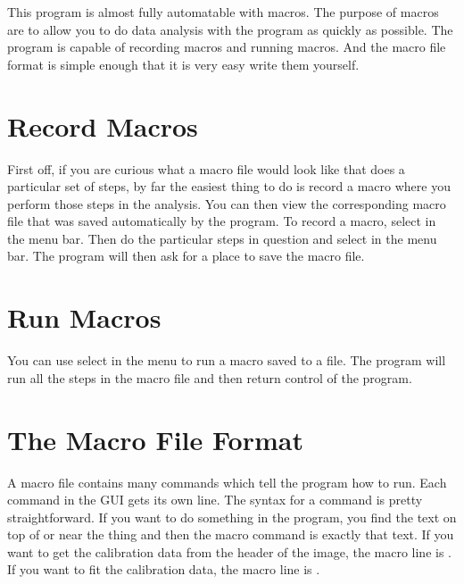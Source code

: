 This program is almost fully automatable with macros. The 
purpose of macros are to allow you to do data analysis with
the program as quickly as possible. The program is capable of
recording macros and running macros. And the macro file format
is simple enough that it is very easy write them yourself.

\section{Record Macros}

First off, if you are curious what a macro file would look
like that does a particular set of steps, by far the easiest
thing to do is record a macro where you perform those steps
in the analysis. You can then view the corresponding macro file 
that was saved automatically by the program. To record a macro,
select  in the  menu 
bar. Then do the particular steps in question and select
 in the  menu bar.
The program will then ask for a place to save the macro file.

\section{Run Macros}

You can use select  in the 
menu to run a macro saved to a file. The program will 
run all the steps in the macro file and then return control
of the program.

\section{The Macro File Format}

A macro file contains many commands which tell the program
how to run. Each command in the GUI gets its own line. 
The syntax for a command is pretty straightforward.
If you want to do
something in the program, you find the text on top of
or near the thing and then the macro command is exactly
that text. If you want to get the calibration data from the
header of the image, the macro line is
. If you want to fit the 
calibration data, the macro line is .

